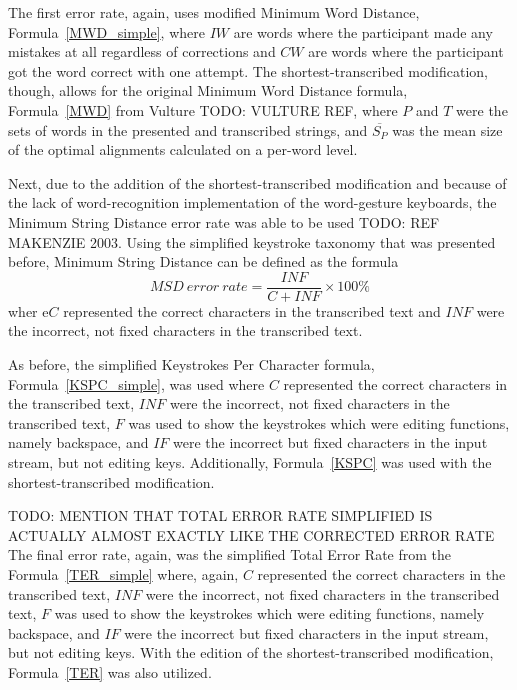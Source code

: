The first error rate, again, uses modified Minimum Word Distance, Formula~\ref{MWD_simple}, where $IW$ are words where the participant made any mistakes at all regardless of corrections and $CW$ are words where the participant got the word correct with one attempt. The shortest-transcribed modification, though, allows for the original Minimum Word Distance formula, Formula~\ref{MWD} from Vulture TODO: VULTURE REF, where $P$ and $T$ were the sets of words in the presented and transcribed strings, and $\overline{S_P}$ was the mean size of the optimal alignments calculated on a per-word level.

Next, due to the addition of the shortest-transcribed modification and because of the lack of word-recognition implementation of the word-gesture keyboards, the Minimum String Distance error rate was able to be used TODO: REF MAKENZIE 2003. Using the simplified keystroke taxonomy that was presented before, Minimum String Distance can be defined as the formula
\begin{equation} \label{pilot_ter}
	MSD\ error\ rate = \frac{INF}{C + INF} \times 100\%
\end{equation}
wher e$C$ represented the correct characters in the transcribed text and $INF$ were the incorrect, not fixed characters in the transcribed text.

As before, the simplified Keystrokes Per Character formula, Formula~\ref{KSPC_simple}, was used where $C$ represented the correct characters in the transcribed text, $INF$ were the incorrect, not fixed characters in the transcribed text, $F$ was used to show the keystrokes which were editing functions, namely backspace, and $IF$ were the incorrect but fixed characters in the input stream, but not editing keys. Additionally, Formula~\ref{KSPC} was used with the shortest-transcribed modification.

TODO: MENTION THAT TOTAL ERROR RATE SIMPLIFIED IS ACTUALLY ALMOST EXACTLY LIKE THE CORRECTED ERROR RATE
The final error rate, again, was the simplified Total Error Rate from the Formula~\ref{TER_simple} where, again, $C$ represented the correct characters in the transcribed text, $INF$ were the incorrect, not fixed characters in the transcribed text, $F$ was used to show the keystrokes which were editing functions, namely backspace, and $IF$ were the incorrect but fixed characters in the input stream, but not editing keys. With the edition of the shortest-transcribed modification, Formula~\ref{TER} was also utilized.

